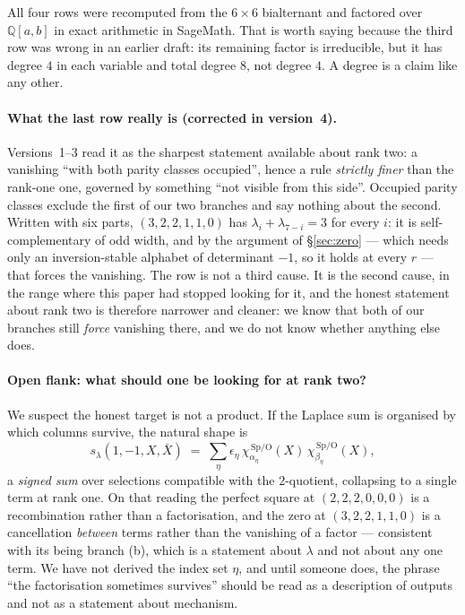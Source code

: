 \documentclass[11pt,a4paper]{article}
\begin{document}
All four rows were recomputed from the $6\times6$ bialternant and factored over $\mathbb{Q}[a,b]$
in exact arithmetic in SageMath. That is worth saying because the third row was wrong in an
earlier draft: its remaining factor is irreducible, but it has degree $4$ in each variable and
total degree $8$, not degree $4$. A degree is a claim like any other.

\paragraph{What the last row really is (corrected in version~4).} Versions~1--3 read it as the
sharpest statement available about rank two: a vanishing ``with both parity classes occupied'',
hence a rule \emph{strictly finer} than the rank-one one, governed by something ``not visible from
this side''. Occupied parity classes exclude the first of our two branches and say nothing about
the second. Written with six parts, $(3,2,2,1,1,0)$ has $\lambda_i+\lambda_{7-i}=3$ for every $i$:
it is self-complementary of odd width, and by the argument of \S\ref{sec:zero} --- which needs only
an inversion-stable alphabet of determinant $-1$, so it holds at every $r$ --- that forces the
vanishing. The row is not a third cause. It is the second cause, in the range where this paper had
stopped looking for it, and the honest statement about rank two is therefore narrower and cleaner:
we know that both of our branches still \emph{force} vanishing there, and we do not know whether
anything else does.

\paragraph{Open flank: what should one be looking for at rank two?} We suspect the honest target
is not a product. If the Laplace sum is organised by which columns survive, the natural shape is
\[
s_\lambda(1,-1,X,\bar X)\;=\;\sum_\eta \epsilon_\eta\,
\chi^{\,\mathrm{Sp/O}}_{\alpha_\eta}(X)\,\chi^{\,\mathrm{Sp/O}}_{\beta_\eta}(X),
\]
a \emph{signed sum} over selections compatible with the $2$-quotient, collapsing to a single
term at rank one. On that reading the perfect square at $(2,2,2,0,0,0)$ is a recombination
rather than a factorisation, and the zero at $(3,2,2,1,1,0)$ is a cancellation \emph{between}
terms rather than the vanishing of a factor --- consistent with its being branch (b), which is a
statement about $\lambda$ and not about any one term. We have not derived the index set $\eta$, and until
someone does, the phrase ``the factorisation sometimes survives'' should be read as a
description of outputs and not as a statement about mechanism.
\end{document}
